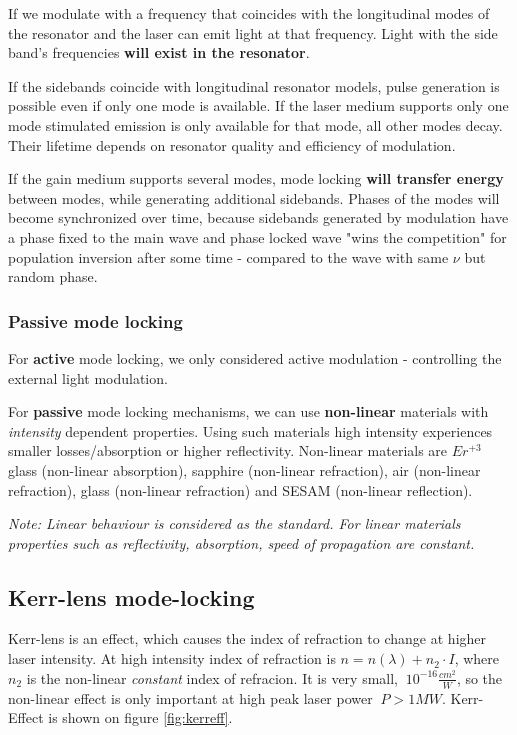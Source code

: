 If we modulate with a frequency that coincides with the longitudinal modes of the resonator and the laser can emit light at that frequency. Light with the side band's frequencies \textbf{will exist in the resonator}.

If the sidebands coincide with longitudinal resonator models, pulse generation is possible even if only one
mode is available.  If the laser medium supports only one mode stimulated emission is only available for that mode, all
other modes decay. Their lifetime depends on resonator quality and efficiency of modulation.

If the gain medium supports several modes, mode locking \textbf{will transfer energy} between modes, while generating additional sidebands.
Phases of the modes will become synchronized over time, because sidebands generated by modulation  have a phase fixed to the main wave and
phase locked wave "wins the competition" for population inversion after some time - compared to the wave with same $\nu$ but random phase.

\subsubsection{Passive mode locking}
For \textbf{active} mode locking, we only considered active modulation - controlling the external light modulation.

For \textbf{passive} mode locking mechanisms, we can use \textbf{non-linear} materials with \textit{intensity} dependent properties.
Using such materials high intensity experiences smaller losses/absorption or higher reflectivity. Non-linear materials are $Er^{+3}$ glass (non-linear absorption), sapphire (non-linear refraction),
air (non-linear refraction), glass (non-linear refraction) and SESAM (non-linear reflection).

\textit{Note: Linear behaviour is considered as the standard. For linear materials properties such as reflectivity, absorption, speed of propagation are constant.}

\subsection{Kerr-lens mode-locking}
Kerr-lens is an effect, which causes the index of refraction to change at higher laser intensity.
At high intensity index of refraction  is $n = n(\lambda) + n_2 \cdot I$, where $n_2$ is the non-linear \textit{constant} index of refracion.
It is very small, $~10^{-16} \frac{cm^2}{W}$, so the non-linear effect is only important at high peak laser power $~P > 1MW$.
Kerr-Effect is shown on figure \ref{fig:kerreff}.


